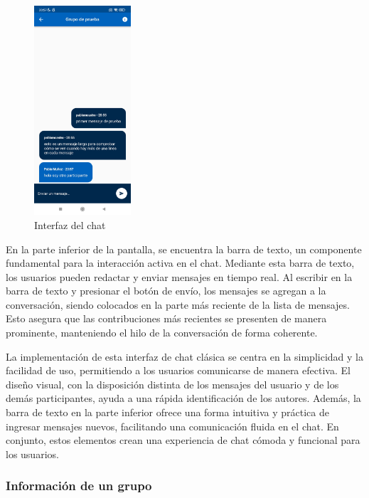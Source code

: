 \documentclass{article}
\begin{document}
\begin{figure}
    \includegraphics[width=0.32\textwidth]{imagenes/pantallas/grupos/chat.jpg}
    \caption{Interfaz del chat}
    \vspace{-4\intextsep}
\end{figure}

En la parte inferior de la pantalla, se encuentra la barra de texto, un componente fundamental para la interacción activa en el chat. Mediante esta barra de texto, los usuarios pueden redactar y enviar mensajes en tiempo real. Al escribir en la barra de texto y presionar el botón de envío, los mensajes se agregan a la conversación, siendo colocados en la parte más reciente de la lista de mensajes. Esto asegura que las contribuciones más recientes se presenten de manera prominente, manteniendo el hilo de la conversación de forma coherente.

La implementación de esta interfaz de chat clásica se centra en la simplicidad y la facilidad de uso, permitiendo a los usuarios comunicarse de manera efectiva. El diseño visual, con la disposición distinta de los mensajes del usuario y de los demás participantes, ayuda a una rápida identificación de los autores. Además, la barra de texto en la parte inferior ofrece una forma intuitiva y práctica de ingresar mensajes nuevos, facilitando una comunicación fluida en el chat. En conjunto, estos elementos crean una experiencia de chat cómoda y funcional para los usuarios.

\subsubsection{Información de un grupo}
\end{document}
